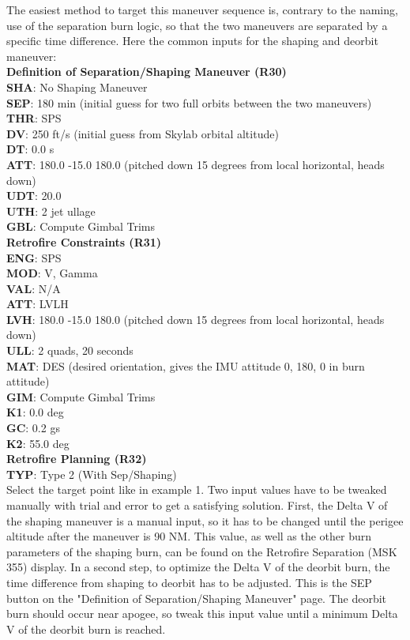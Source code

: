 \documentclass[11pt]{article} %
\begin{document}
The easiest method to target this maneuver sequence is, contrary to the naming, use of the separation burn logic, so that the two maneuvers are separated by a specific time difference. Here the common inputs for the shaping and deorbit maneuver:\\

\textbf{Definition of Separation/Shaping Maneuver (R30)}\\
\textbf{SHA}: No Shaping Maneuver\\
\textbf{SEP}: 180 min (initial guess for two full orbits between the two maneuvers)\\
\textbf{THR}: SPS\\
\textbf{DV}: 250 ft/s (initial guess from Skylab orbital altitude)\\
\textbf{DT}: 0.0 s\\
\textbf{ATT}: 180.0 -15.0 180.0 (pitched down 15 degrees from local horizontal, heads down)\\
\textbf{UDT}: 20.0\\
\textbf{UTH}: 2 jet ullage\\
\textbf{GBL}: Compute Gimbal Trims\\

\textbf{Retrofire Constraints (R31)}\\
\textbf{ENG}: SPS\\
\textbf{MOD}: V, Gamma\\
\textbf{VAL}: N/A\\
\textbf{ATT}: LVLH\\
\textbf{LVH}: 180.0 -15.0 180.0 (pitched down 15 degrees from local horizontal, heads down)\\
\textbf{ULL}: 2 quads, 20 seconds\\
\textbf{MAT}: DES (desired orientation, gives the IMU attitude 0, 180, 0 in burn attitude)\\
\textbf{GIM}: Compute Gimbal Trims\\
\textbf{K1}: 0.0 deg\\
\textbf{GC}: 0.2 gs\\
\textbf{K2}: 55.0 deg\\

\textbf{Retrofire Planning (R32)}\\
\textbf{TYP}: Type 2 (With Sep/Shaping)\\

Select the target point like in example 1. Two input values have to be tweaked manually with trial and error to get a satisfying solution. First, the Delta V of the shaping maneuver is a manual input, so it has to be changed until the perigee altitude after the maneuver is 90 NM. This value, as well as the other burn parameters of the shaping burn, can be found on the Retrofire Separation (MSK 355) display. In a second step, to optimize the Delta V of the deorbit burn, the time difference from shaping to deorbit has to be adjusted. This is the SEP button on the "Definition of Separation/Shaping Maneuver" page. The deorbit burn should occur near apogee, so tweak this input value until a minimum Delta V of the deorbit burn is reached.\\
\end{document}
